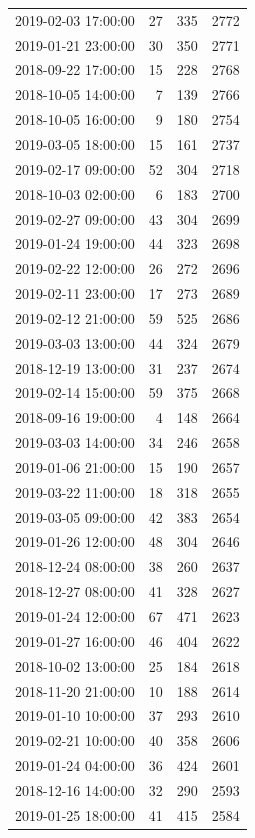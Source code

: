 \begin{tabular}{lrrr}
2019-02-03 17:00:00 & 27 & 335 & 2772 \\
2019-01-21 23:00:00 & 30 & 350 & 2771 \\
2018-09-22 17:00:00 & 15 & 228 & 2768 \\
2018-10-05 14:00:00 & 7 & 139 & 2766 \\
2018-10-05 16:00:00 & 9 & 180 & 2754 \\
2019-03-05 18:00:00 & 15 & 161 & 2737 \\
2019-02-17 09:00:00 & 52 & 304 & 2718 \\
2018-10-03 02:00:00 & 6 & 183 & 2700 \\
2019-02-27 09:00:00 & 43 & 304 & 2699 \\
2019-01-24 19:00:00 & 44 & 323 & 2698 \\
2019-02-22 12:00:00 & 26 & 272 & 2696 \\
2019-02-11 23:00:00 & 17 & 273 & 2689 \\
2019-02-12 21:00:00 & 59 & 525 & 2686 \\
2019-03-03 13:00:00 & 44 & 324 & 2679 \\
2018-12-19 13:00:00 & 31 & 237 & 2674 \\
2019-02-14 15:00:00 & 59 & 375 & 2668 \\
2018-09-16 19:00:00 & 4 & 148 & 2664 \\
2019-03-03 14:00:00 & 34 & 246 & 2658 \\
2019-01-06 21:00:00 & 15 & 190 & 2657 \\
2019-03-22 11:00:00 & 18 & 318 & 2655 \\
2019-03-05 09:00:00 & 42 & 383 & 2654 \\
2019-01-26 12:00:00 & 48 & 304 & 2646 \\
2018-12-24 08:00:00 & 38 & 260 & 2637 \\
2018-12-27 08:00:00 & 41 & 328 & 2627 \\
2019-01-24 12:00:00 & 67 & 471 & 2623 \\
2019-01-27 16:00:00 & 46 & 404 & 2622 \\
2018-10-02 13:00:00 & 25 & 184 & 2618 \\
2018-11-20 21:00:00 & 10 & 188 & 2614 \\
2019-01-10 10:00:00 & 37 & 293 & 2610 \\
2019-02-21 10:00:00 & 40 & 358 & 2606 \\
2019-01-24 04:00:00 & 36 & 424 & 2601 \\
2018-12-16 14:00:00 & 32 & 290 & 2593 \\
2019-01-25 18:00:00 & 41 & 415 & 2584 \\

\end{tabular}
